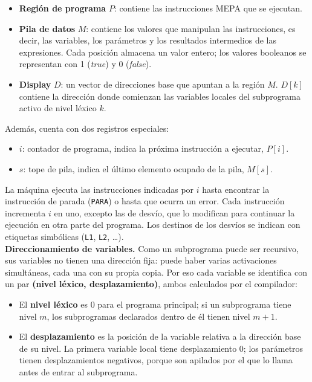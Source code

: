 \documentclass[12pt]{article}
\begin{document}
\begin{itemize}
    \item \textbf{Región de programa} $P$: contiene las instrucciones MEPA que se ejecutan.
    \item \textbf{Pila de datos} $M$: contiene los valores que manipulan las instrucciones, es decir, las variables, los parámetros y los resultados intermedios de las expresiones. Cada posición almacena un valor entero; los valores booleanos se representan con 1 (\textit{true}) y 0 (\textit{false}).
    \item \textbf{Display} $D$: un vector de direcciones base que apuntan a la región $M$. $D[k]$ contiene la dirección donde comienzan las variables locales del subprograma activo de nivel léxico $k$.
\end{itemize}

Además, cuenta con dos registros especiales:

\begin{itemize}
    \item $i$: contador de programa, indica la próxima instrucción a ejecutar, $P[i]$.
    \item $s$: tope de pila, indica el último elemento ocupado de la pila, $M[s]$.
\end{itemize}

La máquina ejecuta las instrucciones indicadas por $i$ hasta encontrar la instrucción de parada (\texttt{PARA}) o hasta que ocurra un error. Cada instrucción incrementa $i$ en uno, excepto las de desvío, que lo modifican para continuar la ejecución en otra parte del programa. Los destinos de los desvíos se indican con etiquetas simbólicas (\texttt{L1}, \texttt{L2}, \ldots). \\

\textbf{Direccionamiento de variables.} Como un subprograma puede ser recursivo, sus variables no tienen una dirección fija: puede haber varias activaciones simultáneas, cada una con su propia copia. Por eso cada variable se identifica con un par \textbf{(nivel léxico, desplazamiento)}, ambos calculados por el compilador:

\begin{itemize}
    \item El \textbf{nivel léxico} es 0 para el programa principal; si un subprograma tiene nivel $m$, los subprogramas declarados dentro de él tienen nivel $m+1$.
    \item El \textbf{desplazamiento} es la posición de la variable relativa a la dirección base de su nivel. La primera variable local tiene desplazamiento 0; los parámetros tienen desplazamientos negativos, porque son apilados por el que lo llama antes de entrar al subprograma.
\end{itemize}
\end{document}
